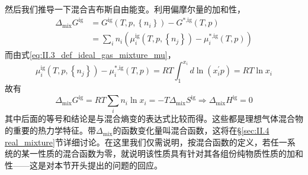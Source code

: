 \documentclass[main.tex]{subfiles}
\begin{document}
然后我们推导一下混合吉布斯自由能变。利用偏摩尔量的加和性，
\begin{align*}
    \Delta_\text{mix}G^\text{ig} & =G^\text{ig}\left(T,p,\left\{n_i\right\}\right)-G^\text{*,ig}\left(T,p\right)                               \\
                                 & =\sum_in_i\left(\mu_i^\text{ig}\left(T,p,\left\{n_j\right\}\right)-\mu_i^\text{*,ig}\left(T,p\right)\right)
\end{align*}
而由式\eqref{eq:II.3_def_ideal_gas_mixture_mu}，
\[\mu_i^\text{ig}\left(T,p,\left\{n_j\right\}\right)-\mu_i^\text{*,ig}\left(T,p\right)=RT\int_{1}^{x_i}d\ln\left(x_i^\prime p\right)=RT\ln x_i\]
故有
\[\Delta_\text{mix}G^\text{ig}=RT\sum_in_i\ln x_i=-T\Delta_\text{mix}S^\text{ig}\Rightarrow\Delta_\text{mix}H^\text{ig}=0\]
其中后面的等号和结论是与混合熵变的表达式比较而得。这些都是理想气体混合物的重要的热力学特征。带$\Delta_\text{mix}$的函数变化量叫混合函数，这将在\S\ref{sec:II.4 real_mixture}节详细讨论。在这里我们仅需说明，按混合函数的定义，若任一系统的某一性质的混合函数为零，就说明该性质具有针对其各组份纯物质性质的加和性——这是对本节开头提出的问题的回应。
\end{document}
